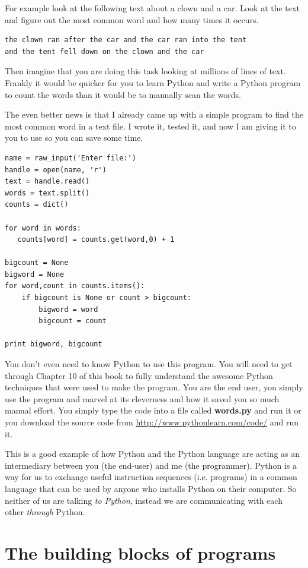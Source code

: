 \documentclass[11pt]{book}
\begin{document}
For example look at the following text about a clown and a car.  Look at the 
text and figure out the most common word and how many times it occurs.

\beforeverb
\begin{verbatim}
the clown ran after the car and the car ran into the tent 
and the tent fell down on the clown and the car 
\end{verbatim}
\afterverb
%
Then imagine that you are doing this task looking at millions of lines of 
text.  Frankly it would be quicker for you to learn Python and write a 
Python program to count the words than it would be to manually 
scan the words.

The even better news is that I already came up with a simple program to 
find the most common word in a text file.  I wrote it,
tested it, and now I am giving it to you to use so you can save some time.

\beforeverb
\begin{verbatim}
name = raw_input('Enter file:')
handle = open(name, 'r')
text = handle.read()
words = text.split()
counts = dict()

for word in words:
   counts[word] = counts.get(word,0) + 1

bigcount = None
bigword = None
for word,count in counts.items():
    if bigcount is None or count > bigcount:
        bigword = word
        bigcount = count

print bigword, bigcount
\end{verbatim}
\afterverb
%
You don't even need to know Python to use this program.  You will need to get through 
Chapter 10 of this book to fully understand the awesome Python techniques that were
used to make the program.  You are the end user, you simply use the program and marvel
at its cleverness and how it saved you so much manual effort.
You simply type the code 
into a file called {\bf words.py} and run it or you download the source 
code from \url{http://www.pythonlearn.com/code/} and run it.

This is a good example of how Python and the Python language are acting as an intermediary
between you (the end-user) and me (the programmer).  Python is a way for us to exchange useful
instruction sequences (i.e. programs) in a common language that can be used by anyone who 
installs Python on their computer.  So neither of us are talking {\em to Python},
instead we are communicating with each other {\em through} Python.

\section{The building blocks of programs}
\end{document}
